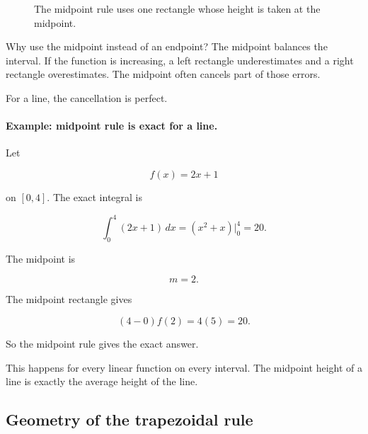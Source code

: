 \begin{figure}[h]
\centering
{}
\caption{The midpoint rule uses one rectangle whose height is taken at the midpoint.}
\label{fig:midpoint-single-interval}
\end{figure}

Why use the midpoint instead of an endpoint?  The midpoint balances the interval.  If the
function is increasing, a left rectangle underestimates and a right rectangle overestimates.
The midpoint often cancels part of those errors.

For a line, the cancellation is perfect.

\paragraph{Example: midpoint rule is exact for a line.}
Let

\[
f(x)=2x+1
\]

on \([0,4]\).  The exact integral is

\[
\int_0^4 (2x+1)\,dx
=
\left(x^2+x\right)\Big|_0^4
=
20.
\]

The midpoint is

\[
m=2.
\]

The midpoint rectangle gives

\[
(4-0)f(2)=4(5)=20.
\]

So the midpoint rule gives the exact answer.

This happens for every linear function on every interval.  The midpoint height of a line
is exactly the average height of the line.

\subsection{Geometry of the trapezoidal rule}
\label{subsec:geometry-trapezoidal-rule}


